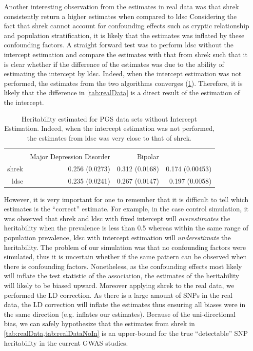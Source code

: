 	Another interesting observation from the estimates in real data was that \gls{shrek} consistently return a higher estimates when compared to \gls{ldsc}
	Considering the fact that \gls{shrek} cannot account for confounding effects such as cryptic relationship and population stratification, it is likely that the estimates was inflated by these confounding factors.
	A straight forward test was to perform \gls{ldsc} without the intercept estimation and compare the estimates with that from \gls{shrek} such that it is clear whether if the difference of the estimates was due to the ability of estimating the intercept by \gls{ldsc}.
	Indeed, when the intercept estimation was not performed, the estimates from the two algorithms converges (\cref{tab:realDataNoIn}).
	Therefore, it is likely that the difference in \cref{tab:realData} is a direct result of the estimation of the intercept.
	 \begin{table}
	 	\centering
	 	\begin{tabular}{rrrr}
	 		\toprule
	 		\\
	 		& Major Depression Disorder & Bipolar & \Glng{scz}\\
	 		\midrule
	 		\gls{shrek}   & 0.256 (0.0273)  & 0.312 (0.0168)  & 0.174 (0.00453) \\
	 		\gls{ldsc}   & 0.235 (0.0241) & 0.267 (0.0147) & 0.197 (0.0058)\\
	 		\bottomrule
	 	\end{tabular}
	 	\caption[Heritability Estimated for PGC Data Sets without Intercept Estimation]{			
	 		Heritability estimated for \gls{PGS} data sets without Intercept Estimation.
	 		Indeed, when the intercept estimation was not performed, the estimates from \gls{ldsc} was very close to that of \gls{shrek}. 
	 	}
	 	\label{tab:realDataNoIn}
	 \end{table}
	 
	However, it is very important for one to remember that it is difficult to tell which estimates is the ``correct'' estimate.
	For example, in the case control simulation, it was observed that \gls{shrek} and \gls{ldsc} with fixed intercept will \emph{overestimates} the heritability when the prevalence is less than 0.5 whereas within the same range of population prevalence, \gls{ldsc} with intercept estimation will \emph{underestimate} the heritability.
	The problem of our simulation was that no confounding factors were simulated, thus it is uncertain whether if the same pattern can be observed when there is confounding factors.
	Nonetheless, as the confounding effects most likely will inflate the test statistic of the association, the estimates of the heritability will likely to be biased upward.
	Moreover applying \gls{shrek} to the real data, we performed the \gls{LD} correction.
	As there is a large amount of \glspl{SNP} in the real data, the \gls{LD} correction will inflate the estimates thus ensuring all biases were in the same direction (e.g. inflates our estimates).
	Because of the uni-directional bias, we can safely hypothesize that the estimates from \gls{shrek} in \cref{tab:realData,tab:realDataNoIn} is an upper-bound for the true ``detectable'' \gls{SNP} heritability in the current \gls{GWAS} studies.
	
